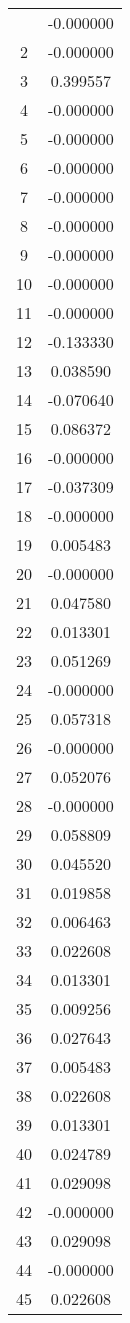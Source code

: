 \documentclass[12pt]{article}
\begin{document}
\begin{longtable}{@{}cc@{}}
\bottomrule
\endlastfoot
1 & -0.000000 \\
2 & -0.000000 \\
3 & 0.399557 \\
4 & -0.000000 \\
5 & -0.000000 \\
6 & -0.000000 \\
7 & -0.000000 \\
8 & -0.000000 \\
9 & -0.000000 \\
10 & -0.000000 \\
11 & -0.000000 \\
12 & -0.133330 \\
13 & 0.038590 \\
14 & -0.070640 \\
15 & 0.086372 \\
16 & -0.000000 \\
17 & -0.037309 \\
18 & -0.000000 \\
19 & 0.005483 \\
20 & -0.000000 \\
21 & 0.047580 \\
22 & 0.013301 \\
23 & 0.051269 \\
24 & -0.000000 \\
25 & 0.057318 \\
26 & -0.000000 \\
27 & 0.052076 \\
28 & -0.000000 \\
29 & 0.058809 \\
30 & 0.045520 \\
31 & 0.019858 \\
32 & 0.006463 \\
33 & 0.022608 \\
34 & 0.013301 \\
35 & 0.009256 \\
36 & 0.027643 \\
37 & 0.005483 \\
38 & 0.022608 \\
39 & 0.013301 \\
40 & 0.024789 \\
41 & 0.029098 \\
42 & -0.000000 \\
43 & 0.029098 \\
44 & -0.000000 \\
45 & 0.022608 \\

\end{longtable}
\end{document}
